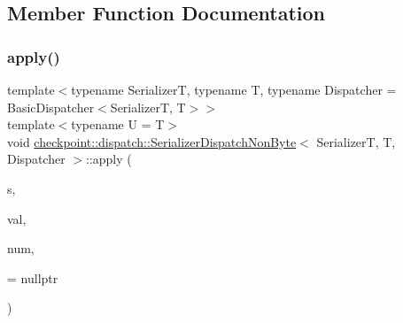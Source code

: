 \subsection{Member Function Documentation}
\mbox{\label{structcheckpoint_1_1dispatch_1_1_serializer_dispatch_non_byte_a12e7e180be642ec9eaaac93972e28856}} 
\subsubsection{\texorpdfstring{apply()}{apply()}\hspace{0.1cm}{\footnotesize\ttfamily [1/2]}}
{\footnotesize\ttfamily template$<$typename SerializerT, typename T, typename Dispatcher = Basic\+Dispatcher$<$\+Serializer\+T, T$>$$>$ \\
template$<$typename U  = T$>$ \\
void \hyperlink{structcheckpoint_1_1dispatch_1_1_serializer_dispatch_non_byte}{checkpoint\+::dispatch\+::\+Serializer\+Dispatch\+Non\+Byte}$<$ SerializerT, T, Dispatcher $>$\+::apply (\begin{DoxyParamCaption}\item[{SerializerT \&}]{s,  }\item[{T $\ast$}]{val,  }\item[{\hyperlink{namespacecheckpoint_a083f6674da3f94c2901b18c6d238217c}{Serial\+Size\+Type}}]{num,  }\item[{\hyperlink{structcheckpoint_1_1dispatch_1_1_serializer_dispatch_non_byte_a51b98addaa52e3e576c48c150aa66583}{has\+Virtual\+Serialize}$<$ U $>$ $\ast$}]{ = {\ttfamily nullptr} }\end{DoxyParamCaption})\hspace{0.3cm}{\ttfamily [inline]}}

\mbox{\label{structcheckpoint_1_1dispatch_1_1_serializer_dispatch_non_byte_ae6e291caec4d650a7d91e78a209a1964}} 

